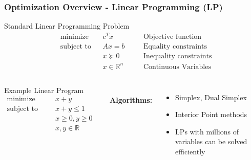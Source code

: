 \begin{frame}
    \frametitle{Optimization Overview - Linear Programming (LP)}
    \begin{block}{Standard Linear Programming Problem}
        \begin{align*}
            & \text{minimize} && c^T x &&\quad\text{Objective function}\\
            & \text{subject to} && A x = b  &&\quad\text{Equality constraints} \\
            &    && x \succeq 0 &&\quad\text{Inequality constraints} \\
            &    && x \in \mathbb{R}^n  &&\quad\text{Continuous Variables}
        \end{align*}
    \end{block}
    \begin{columns}
          \begin{exampleblock}{Example Linear Program}
              \begin{align*}
                  \text{minimize} \qquad & x+y \\
                  \text{subject to} \quad \quad & x+y \leq 1 \\
                  \qquad \qquad & x \geq 0, y \geq 0 \\
                  \qquad \qquad & x,y \in \mathbb{R}
              \end{align*}
          \end{exampleblock}
      \ \\\
        \textbf{Algorithms:}
        \begin{itemize}
            \item Simplex, Dual Simplex
            \item Interior Point methods
            \item LPs with millions of variables can be solved efficiently
        \end{itemize}
      \end{columns}
\end{frame}

